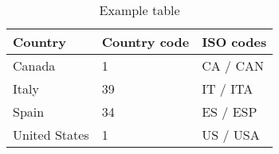 \begin{table}[tbp]
\centering
\caption{Example table}
\label{tab:example}
\begin{tabular}{@{}lll@{}}
\toprule
Country       & Country code & ISO codes \\ \midrule
Canada        & 1            & CA / CAN  \\
Italy         & 39           & IT / ITA  \\
Spain         & 34           & ES / ESP  \\
United States & 1            & US / USA  \\ \bottomrule
\end{tabular}
\end{table}

